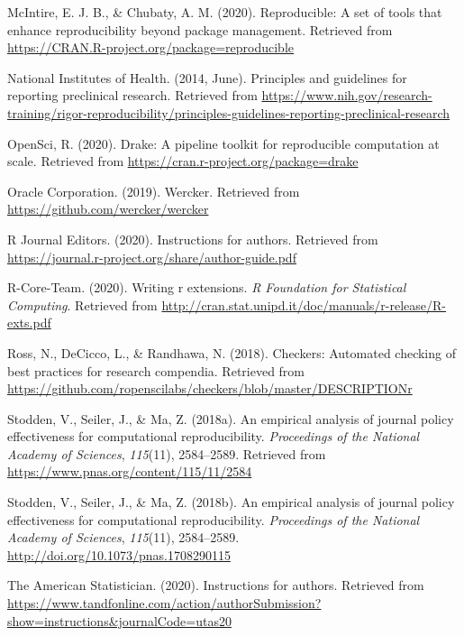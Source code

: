 \documentclass[12pt,twoside]{reedthesis}
\begin{document}
\hypertarget{ref-R-reproducible}{}
McIntire, E. J. B., \& Chubaty, A. M. (2020). Reproducible: A set of
tools that enhance reproducibility beyond package management. Retrieved
from \url{https://CRAN.R-project.org/package=reproducible}

\hypertarget{ref-bio-principles}{}
National Institutes of Health. (2014, June). Principles and guidelines
for reporting preclinical research. Retrieved from
\url{https://www.nih.gov/research-training/rigor-reproducibility/principles-guidelines-reporting-preclinical-research}

\hypertarget{ref-R-drake}{}
OpenSci, R. (2020). Drake: A pipeline toolkit for reproducible
computation at scale. Retrieved from
\url{https://cran.r-project.org/package=drake}

\hypertarget{ref-wercker}{}
Oracle Corporation. (2019). Wercker. Retrieved from
\url{https://github.com/wercker/wercker}

\hypertarget{ref-r-journal}{}
R Journal Editors. (2020). Instructions for authors. Retrieved from
\url{https://journal.r-project.org/share/author-guide.pdf}

\hypertarget{ref-coreteam-extensions}{}
R-Core-Team. (2020). Writing r extensions. \emph{R Foundation for
Statistical Computing}. Retrieved from
\url{http://cran.stat.unipd.it/doc/manuals/r-release/R-exts.pdf}

\hypertarget{ref-R-checkers}{}
Ross, N., DeCicco, L., \& Randhawa, N. (2018). Checkers: Automated
checking of best practices for research compendia. Retrieved from
\url{https://github.com/ropenscilabs/checkers/blob/master/DESCRIPTIONr}

\hypertarget{ref-policy-effectiveness}{}
Stodden, V., Seiler, J., \& Ma, Z. (2018a). An empirical analysis of
journal policy effectiveness for computational reproducibility.
\emph{Proceedings of the National Academy of Sciences}, \emph{115}(11),
2584--2589. Retrieved from
\url{https://www.pnas.org/content/115/11/2584}

\hypertarget{ref-Stodden2584}{}
Stodden, V., Seiler, J., \& Ma, Z. (2018b). An empirical analysis of
journal policy effectiveness for computational reproducibility.
\emph{Proceedings of the National Academy of Sciences}, \emph{115}(11),
2584--2589. \url{http://doi.org/10.1073/pnas.1708290115}

\hypertarget{ref-ams-guide}{}
The American Statistician. (2020). Instructions for authors. Retrieved
from
\url{https://www.tandfonline.com/action/authorSubmission?show=instructions\&journalCode=utas20}
\end{document}
